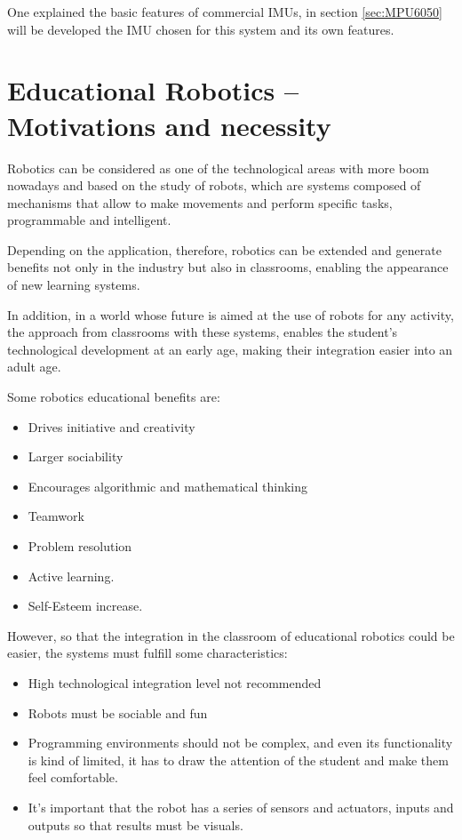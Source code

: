 One explained the basic features of commercial IMUs, in section \ref{sec:MPU6050} will be developed the IMU chosen for this system and its own features.

\section{Educational Robotics – Motivations and necessity}

Robotics\cite{6826237} can be considered as one of the technological areas with more boom nowadays and based on the study of robots, which are systems composed of mechanisms that allow to make movements and perform specific tasks, programmable and intelligent. \newline

Depending on the application, therefore, robotics can be extended and generate benefits not only in the industry but also in classrooms, enabling the appearance of new learning systems.\newline

In addition, in a world whose future is aimed at the use of robots for any activity, the approach from classrooms with these systems, enables the student’s technological development at an early age, making their integration easier into an adult age.\newline

Some robotics educational benefits are:  
\begin{itemize}
	\item Drives initiative and creativity
	\item Larger sociability
	\item Encourages algorithmic and mathematical thinking
	\item Teamwork
	\item Problem resolution
	\item Active learning.
	\item Self-Esteem increase.
\end{itemize}

However, so that the integration in the classroom of educational robotics could be easier, the systems must fulfill some characteristics:

\begin{itemize}
	\item High technological integration level not recommended
	\item Robots must be sociable and fun
	\item Programming environments should not be complex, and even its functionality is kind of limited, it has to draw the attention of the student and make them feel comfortable.
	\item It’s important that the robot has a series of sensors and actuators, inputs and outputs so that results must be visuals.
\end{itemize}

